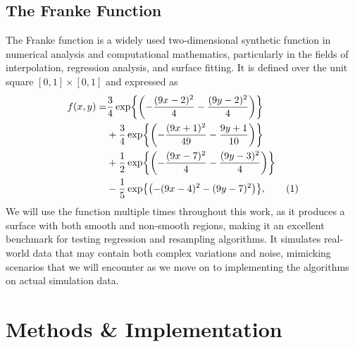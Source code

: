 \documentclass[aps,pra,english,notitlepage,reprint,nofootinbib]{revtex4-1}  %
\newcommand\numberthis{\addtocounter{equation}{1}\tag{\theequation}}
\begin{document}
\subsection{The Franke Function}\label{subsec:franke}
The Franke function is a widely used two-dimensional synthetic function in numerical analysis and computational mathematics, particularly in the fields of interpolation, regression analysis, and surface fitting. It is defined over the unit square $[0, 1] \times [0, 1]$ and expressed as
\begin{align*}
  f(x,y) =& \frac{3}{4} \exp{\left( -\frac{(9x - 2)^2}{4} - \frac{(9y - 2)^2}{4} \right)} \\
&+ \frac{3}{4} \exp{\left( -\frac{(9x + 1)^2}{49} - \frac{9y + 1}{10} \right)} \\
&+ \frac{1}{2} \exp{\left( -\frac{(9x - 7)^2}{4} - \frac{(9y - 3)^2}{4} \right)} \\
&- \frac{1}{5} \exp{\left( -(9x - 4)^2 - (9y - 7)^2 \right)}, \numberthis\label{eq:Franke}
\end{align*}
We will use the function multiple times throughout this work, as it produces a surface with both smooth and non-smooth regions, making it an excellent benchmark for testing regression and resampling algorithms. It simulates real-world data that may contain both complex variations and noise, mimicking scenarios that we will encounter as we move on to implementing the algorithms on actual simulation data.


\section{Methods \& Implementation}\label{sec:methods}

\end{document}
